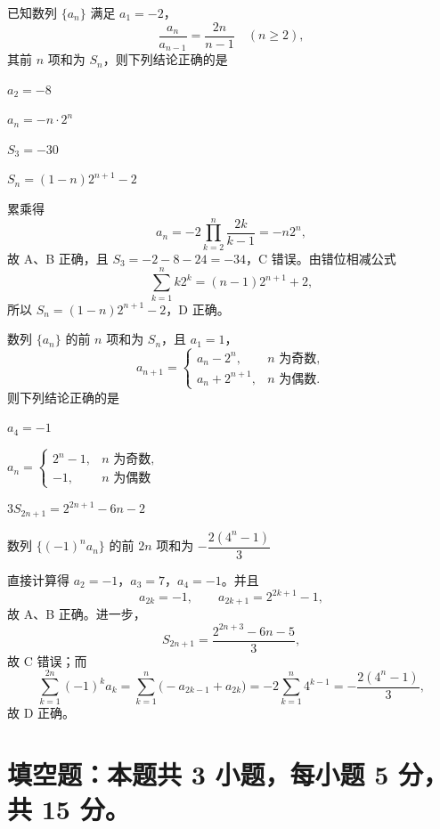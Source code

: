 \begin{question}[points=6]
已知数列 $\{a_n\}$ 满足 $a_1=-2$，
\[
 \frac{a_n}{a_{n-1}}=\frac{2n}{n-1}\quad(n\ge2),
\]
其前 $n$ 项和为 $S_n$，则下列结论正确的是 \paren[ABD]
\begin{choices}
  \item $a_2=-8$
  \item $a_n=-n\cdot2^n$
  \item $S_3=-30$
  \item $S_n=(1-n)2^{n+1}-2$
\end{choices}
\begin{solution}
累乘得
\[
 a_n=-2\prod_{k=2}^{n}\frac{2k}{k-1}=-n2^n,
\]
故 A、B 正确，且 $S_3=-2-8-24=-34$，C 错误。由错位相减公式
\[
 \sum_{k=1}^{n}k2^k=(n-1)2^{n+1}+2,
\]
所以 $S_n=(1-n)2^{n+1}-2$，D 正确。
\end{solution}
\end{question}

\begin{question}[points=6]
数列 $\{a_n\}$ 的前 $n$ 项和为 $S_n$，且 $a_1=1$，
\[
 a_{n+1}=\begin{cases}
 a_n-2^n,&n\text{ 为奇数},\\
 a_n+2^{n+1},&n\text{ 为偶数}.
 \end{cases}
\]
则下列结论正确的是 \paren[ABD]
\begin{choices}
  \item $a_4=-1$
  \item $a_n=\begin{cases}2^n-1,&n\text{ 为奇数},\\-1,&n\text{ 为偶数}
  \end{cases}$
  \item $3S_{2n+1}=2^{2n+1}-6n-2$
  \item 数列 $\{(-1)^na_n\}$ 的前 $2n$ 项和为 $-\dfrac{2(4^n-1)}3$
\end{choices}
\begin{solution}
直接计算得 $a_2=-1$，$a_3=7$，$a_4=-1$。并且
\[
 a_{2k}=-1,\qquad a_{2k+1}=2^{2k+1}-1,
\]
故 A、B 正确。进一步，
\[
 S_{2n+1}=\frac{2^{2n+3}-6n-5}{3},
\]
故 C 错误；而
\[
 \sum_{k=1}^{2n}(-1)^ka_k
 =\sum_{k=1}^{n}\bigl(-a_{2k-1}+a_{2k}\bigr)
 =-2\sum_{k=1}^{n}4^{k-1}
 =-\frac{2(4^n-1)}3,
\]
故 D 正确。
\end{solution}
\end{question}

\section{填空题：本题共 3 小题，每小题 5 分，共 15 分。}

